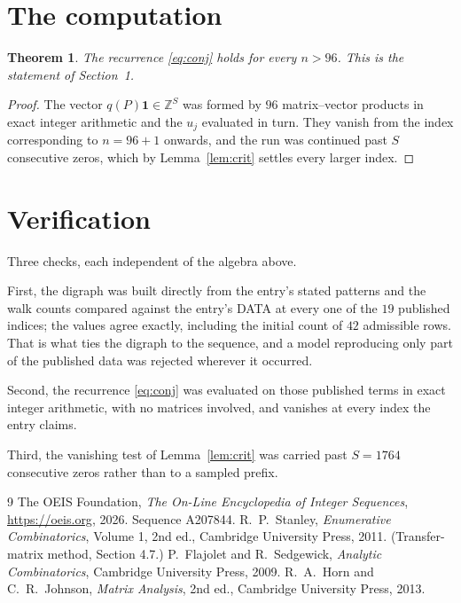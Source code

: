 \documentclass[11pt,a4paper]{article}
\theoremstyle{plain}
\newtheorem{theorem}{Theorem}
\theoremstyle{definition}
\begin{document}
\section{The computation}

\begin{theorem}
The recurrence \eqref{eq:conj} holds for every $n>96$. This is the statement of
Section~1.
\end{theorem}

\begin{proof}
The vector $q(P)\mathbf{1}\in\mathbb{Z}^{S}$ was formed by $96$ matrix--vector
products in exact integer arithmetic and the $u_j$ evaluated in turn. They vanish from the
index corresponding to $n=96+1$ onwards, and the run was continued past $S$ consecutive
zeros, which by Lemma~\ref{lem:crit} settles every larger index.
\end{proof}

\section{Verification}

Three checks, each independent of the algebra above.

First, the digraph was built directly from the entry's stated patterns and the walk counts
compared against the entry's DATA at every one of the $19$ published indices; the
values agree exactly, including the initial count of $42$ admissible rows. That is
what ties the digraph to the sequence, and a model reproducing only part of the published
data was rejected wherever it occurred.

Second, the recurrence \eqref{eq:conj} was evaluated on those published terms in exact
integer arithmetic, with no matrices involved, and vanishes at every index the entry claims.

Third, the vanishing test of Lemma~\ref{lem:crit} was carried past $S=1764$ consecutive
zeros rather than to a sampled prefix.

\begin{thebibliography}{9}
 The OEIS Foundation, \emph{The On-Line Encyclopedia of Integer
Sequences}, \url{https://oeis.org}, 2026. Sequence A207844.
 R.~P.~Stanley, \emph{Enumerative Combinatorics}, Volume 1, 2nd ed.,
Cambridge University Press, 2011. (Transfer-matrix method, Section 4.7.)
 P.~Flajolet and R.~Sedgewick, \emph{Analytic Combinatorics}, Cambridge
University Press, 2009.
 R.~A.~Horn and C.~R.~Johnson, \emph{Matrix Analysis}, 2nd ed., Cambridge
University Press, 2013.
\end{thebibliography}
\end{document}
